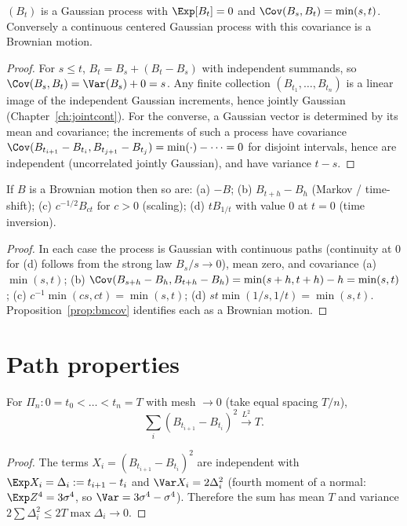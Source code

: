 \begin{proposition}\label{prop:bmcov}
$(B_t)$ is a Gaussian process with $\Exp[B_t]=0$ and $\Cov(B_s,B_t)=\min(s,t)$.
Conversely a continuous centered Gaussian process with this covariance is a Brownian motion.
\end{proposition}
\begin{proof}
For $s\le t$, $B_t=B_s+(B_t-B_s)$ with independent summands, so
$\Cov(B_s,B_t)=\Var(B_s)+0=s$. Any finite collection $(B_{t_1},\dots,B_{t_n})$ is a
linear image of the independent Gaussian increments, hence jointly Gaussian
(Chapter~\ref{ch:jointcont}). For the converse, a Gaussian vector is determined by its mean
and covariance; the increments of such a process have covariance $\Cov(B_{t_{i+1}}-B_{t_i},B_{t_{j+1}}-B_{t_j})=
\min(\cdot)-\dots=0$ for disjoint intervals, hence are independent (uncorrelated jointly
Gaussian), and have variance $t-s$.
\end{proof}

\begin{proposition}[Symmetries]\label{prop:bmsym}
If $B$ is a Brownian motion then so are: (a) $-B$; (b) $B_{t+h}-B_h$ (Markov / time-shift);
(c) $c^{-1/2}B_{ct}$ for $c>0$ (scaling); (d) $tB_{1/t}$ with value $0$ at $t=0$
(time inversion).
\end{proposition}
\begin{proof}
In each case the process is Gaussian with continuous paths (continuity at $0$ for (d)
follows from the strong law $B_s/s\to0$), mean zero, and covariance
(a) $\min(s,t)$; (b) $\Cov(B_{s+h}-B_h,B_{t+h}-B_h)=\min(s+h,t+h)-h=\min(s,t)$;
(c) $c^{-1}\min(cs,ct)=\min(s,t)$; (d) $st\min(1/s,1/t)=\min(s,t)$.
Proposition~\ref{prop:bmcov} identifies each as a Brownian motion.
\end{proof}

\section{Path properties}

\begin{theorem}\label{thm:qv}
For $\Pi_n:0=t_0<\dots<t_n=T$ with mesh $\to0$ (take equal spacing $T/n$),
\[
\sum_{i}(B_{t_{i+1}}-B_{t_i})^2\xrightarrow{L^2}T .
\]
\end{theorem}
\begin{proof}
The terms $X_i=(B_{t_{i+1}}-B_{t_i})^2$ are independent with $\Exp X_i=\Delta_i:=t_{i+1}-t_i$ and
$\Var X_i=2\Delta_i^2$ (fourth moment of a normal: $\Exp Z^4=3\sigma^4$, so
$\Var=3\sigma^4-\sigma^4$). Therefore the sum has mean $T$ and variance
$2\sum\Delta_i^2\le2T\max\Delta_i\to0$.
\end{proof}

